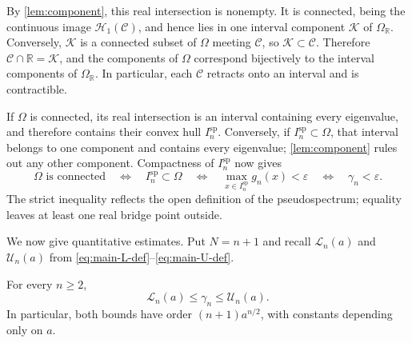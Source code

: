 \documentclass[review,hidelinks,onefignum,onetabnum]{siamart251216}
\newcommand{\R}{\mathbb R}
\begin{document}
By \cref{lem:component}, this real intersection is nonempty.  It is
connected, being the continuous image \(\mathcal H_1(\mathcal C)\), and hence
lies in one interval component \(\mathcal K\) of \(\Omega_\R\).
Conversely, \(\mathcal K\) is a
connected subset of \(\Omega\) meeting \(\mathcal C\), so
\(\mathcal K\subset\mathcal C\).  Therefore
\(\mathcal C\cap\R=\mathcal K\), and the
components of \(\Omega\) correspond bijectively to the interval
components of \(\Omega_\R\).  In particular, each \(\mathcal C\)
retracts onto
an interval and is contractible.

If \(\Omega\) is connected, its real intersection is an interval
containing every eigenvalue, and therefore contains their convex hull
\(I_n^{\mathrm{sp}}\).  Conversely, if
\(I_n^{\mathrm{sp}}\subset\Omega\), that interval belongs to one
component and contains every eigenvalue; \cref{lem:component} rules out
any other component.  Compactness of \(I_n^{\mathrm{sp}}\) now gives
\begin{equation}\label{eq:connected-iff-gamma}
 \Omega\text{ is connected}
 \quad\Longleftrightarrow\quad
 I_n^{\mathrm{sp}}\subset\Omega
 \quad\Longleftrightarrow\quad
 \max_{x\in I_n^{\mathrm{sp}}}g_n(x)<\varepsilon
 \quad\Longleftrightarrow\quad
 \gamma_n<\varepsilon.
\end{equation}
The strict inequality reflects the open definition of the
pseudospectrum; equality leaves at least one real bridge point outside.

We now give quantitative estimates.  Put \(N=n+1\) and recall
\(\mathcal L_n(a)\) and \(\mathcal U_n(a)\) from
\eqref{eq:main-L-def}--\eqref{eq:main-U-def}.

\begin{proposition}\label{prop:gap-bounds}
For every \(n\geq2\),
\begin{equation}\label{eq:gamma-LU}
 \mathcal L_n(a)\leq\gamma_n\leq\mathcal U_n(a).
\end{equation}
In particular, both bounds have order \((n+1)a^{n/2}\), with constants
depending only on \(a\).
\end{proposition}
\end{document}
